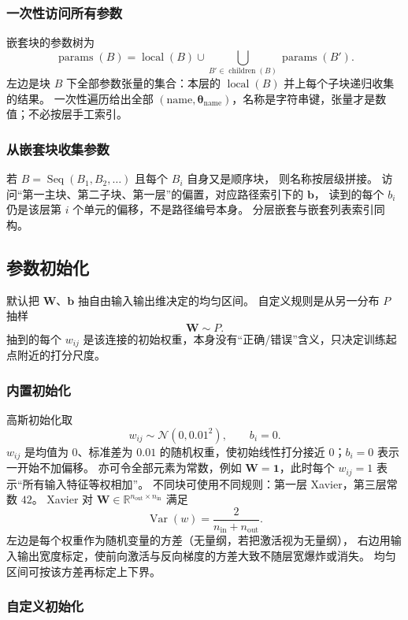 \subsubsection{一次性访问所有参数}

嵌套块的参数树为
\[
\operatorname{params}(B)
=
\operatorname{local}(B)
\cup
\bigcup_{B'\in\operatorname{children}(B)}\operatorname{params}(B').
\]
左边是块 $B$ 下全部参数张量的集合：本层的 $\operatorname{local}(B)$ 并上每个子块递归收集的结果。
一次性遍历给出全部 $(\mathrm{name},\bm{\theta}_{\mathrm{name}})$，名称是字符串键，张量才是数值；不必按层手工索引。

\subsubsection{从嵌套块收集参数}

若 $B=\operatorname{Seq}(B_1,B_2,\ldots)$ 且每个 $B_i$ 自身又是顺序块，
则名称按层级拼接。
访问“第一主块、第二子块、第一层”的偏置，对应路径索引下的 $\bm{b}$，
读到的每个 $b_i$ 仍是该层第 $i$ 个单元的偏移，不是路径编号本身。
分层嵌套与嵌套列表索引同构。

\subsection{参数初始化}

默认把 $\bm{W}$、$\bm{b}$ 抽自由输入输出维决定的均匀区间。
自定义规则是从另一分布 $P$ 抽样
\[
\bm{W}\sim P.
\]
抽到的每个 $w_{ij}$ 是该连接的初始权重，本身没有“正确/错误”含义，只决定训练起点附近的打分尺度。

\subsubsection{内置初始化}

高斯初始化取
\[
w_{ij}\sim\mathcal{N}(0,0.01^{2}),\qquad b_i=0.
\]
$w_{ij}$ 是均值为 $0$、标准差为 $0.01$ 的随机权重，使初始线性打分接近 $0$；$b_i=0$ 表示一开始不加偏移。
亦可令全部元素为常数，例如 $\bm{W}=\bm{1}$，此时每个 $w_{ij}=1$ 表示“所有输入特征等权相加”。
不同块可使用不同规则：第一层 Xavier，第三层常数 $42$。
Xavier 对 $\bm{W}\in\mathbb{R}^{n_{\mathrm{out}}\times n_{\mathrm{in}}}$ 满足
\[
\operatorname{Var}(w)
=
\frac{2}{n_{\mathrm{in}}+n_{\mathrm{out}}}.
\]
左边是每个权重作为随机变量的方差（无量纲，若把激活视为无量纲），
右边用输入输出宽度标定，使前向激活与反向梯度的方差大致不随层宽爆炸或消失。
均匀区间可按该方差再标定上下界。

\subsubsection{自定义初始化}

